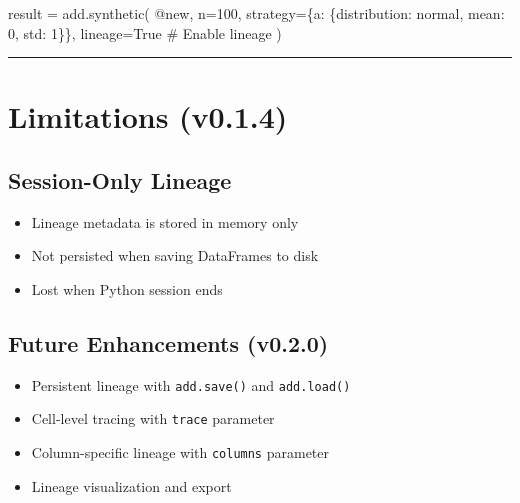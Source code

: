 \documentclass[
  letterpaper,
]{scrbook}
\newenvironment{Shaded}{\begin{snugshade}}{\end{snugshade}}
\newcommand{\CommentTok}[1]{\textcolor[rgb]{0.37,0.37,0.37}{#1}}
\newcommand{\DecValTok}[1]{\textcolor[rgb]{0.68,0.00,0.00}{#1}}
\newcommand{\NormalTok}[1]{\textcolor[rgb]{0.00,0.23,0.31}{#1}}
\newcommand{\OperatorTok}[1]{\textcolor[rgb]{0.37,0.37,0.37}{#1}}
\newcommand{\StringTok}[1]{\textcolor[rgb]{0.13,0.47,0.30}{#1}}
\newcommand{\VariableTok}[1]{\textcolor[rgb]{0.07,0.07,0.07}{#1}}
\providecommand{\tightlist}{%
  \setlength{\itemsep}{0pt}\setlength{\parskip}{0pt}}
\begin{document}
\begin{Shaded}
\begin{Highlighting}[]
\NormalTok{result }\OperatorTok{=}\NormalTok{ add.synthetic(}
    \StringTok{\textquotesingle{}@new\textquotesingle{}}\NormalTok{,}
\NormalTok{    n}\OperatorTok{=}\DecValTok{100}\NormalTok{,}
\NormalTok{    strategy}\OperatorTok{=}\NormalTok{\{}\StringTok{\textquotesingle{}a\textquotesingle{}}\NormalTok{: \{}\StringTok{\textquotesingle{}distribution\textquotesingle{}}\NormalTok{: }\StringTok{\textquotesingle{}normal\textquotesingle{}}\NormalTok{, }\StringTok{\textquotesingle{}mean\textquotesingle{}}\NormalTok{: }\DecValTok{0}\NormalTok{, }\StringTok{\textquotesingle{}std\textquotesingle{}}\NormalTok{: }\DecValTok{1}\NormalTok{\}\},}
\NormalTok{    lineage}\OperatorTok{=}\VariableTok{True}  \CommentTok{\# Enable lineage}
\NormalTok{)}
\end{Highlighting}
\end{Shaded}

\begin{center}\rule{0.5\linewidth}{0.5pt}\end{center}

\section{Limitations (v0.1.4)}\label{limitations-v0.1.4}

\subsection{Session-Only Lineage}\label{session-only-lineage}

\begin{itemize}
\tightlist
\item
  Lineage metadata is stored in memory only
\item
  Not persisted when saving DataFrames to disk
\item
  Lost when Python session ends
\end{itemize}

\subsection{Future Enhancements
(v0.2.0)}\label{future-enhancements-v0.2.0}

\begin{itemize}
\tightlist
\item
  Persistent lineage with \texttt{add.save()} and \texttt{add.load()}
\item
  Cell-level tracing with \texttt{trace} parameter
\item
  Column-specific lineage with \texttt{columns} parameter
\item
  Lineage visualization and export
\end{itemize}
\end{document}
